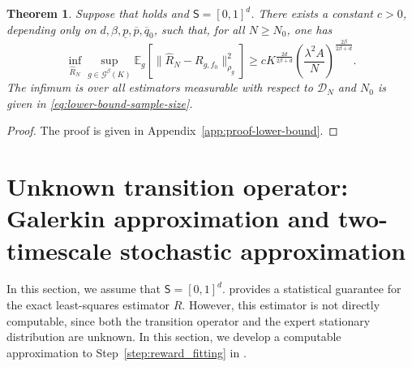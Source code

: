 \documentclass{article}
\newtheorem{theorem}[proposition]{Theorem}
\theoremstyle{definition}
\theoremstyle{remark}
\theoremstyle{plain}
\numberwithin{equation}{section}
\begin{document}
\begin{theorem}
\label{thm:pointwise-lower-bound}
Suppose that  holds and \(\mathsf S=[0,1]^d\). There exists a 
constant \(c >0\), depending only on \(d,
    \beta,
    \underline p,
    \overline p,
    \overline q_0\),
such that, for all \(N\ge N_0\),
one has
\begin{equation}
\label{eq:markovian-L2-lower-bound}
    \inf_{\widehat R_N}
    \sup_{g\in\mathcal G^\beta(K)}
    \mathbb E_g
    \left[
        \|
            \widehat R_N-R_{g,f_0}
        \|_{\rho_g}^2
    \right]
    \geq
    c
    K^{\frac{2d}{2\beta+d}}
    \left(
        \frac{\lambda^2 A}{N}
    \right)^{\frac{2\beta}{2\beta+d}}.
\end{equation}
The infimum is over all estimators measurable with respect to
\(\mathcal D_N\) and \(N_0\) is given in \eqref{eq:lower-bound-sample-size}.
\end{theorem}
\begin{proof}
    The proof is given in Appendix~\ref{app:proof-lower-bound}.  
\end{proof}

\section{Unknown transition operator: Galerkin approximation and
two-timescale stochastic approximation}
\label{sec:estimated-bellman}

In this section, we assume that 
 \(\mathsf S=[0,1]^d\).
 provides a statistical guarantee for the exact least-squares estimator $\widehat R$. However, this estimator is not directly computable, since both the transition operator and the expert stationary distribution are unknown. In this section, we  develop a computable approximation to Step~\ref{step:reward_fitting} in .
\end{document}
